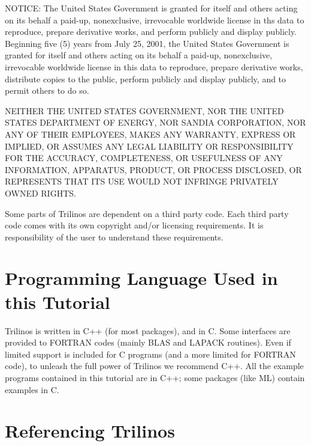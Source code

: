 NOTICE: The United States Government is granted for itself and others
acting on its behalf a paid-up, nonexclusive, irrevocable worldwide
license in ths data to reproduce, prepare derivative works, and perform
publicly and display publicly.  Beginning five (5) years from July 25,
2001, the United States Government is granted for itself and others
acting on its behalf a paid-up, nonexclusive, irrevocable worldwide
license in this data to reproduce, prepare derivative works, distribute
copies to the public, perform publicly and display publicly, and to
permit others to do so.

NEITHER THE UNITED STATES GOVERNMENT, NOR THE UNITED STATES DEPARTMENT
OF ENERGY, NOR SANDIA CORPORATION, NOR ANY OF THEIR EMPLOYEES, MAKES ANY
WARRANTY, EXPRESS OR IMPLIED, OR ASSUMES ANY LEGAL LIABILITY OR
RESPONSIBILITY FOR THE ACCURACY, COMPLETENESS, OR USEFULNESS OF ANY
INFORMATION, APPARATUS, PRODUCT, OR PROCESS DISCLOSED, OR REPRESENTS
THAT ITS USE WOULD NOT INFRINGE PRIVATELY OWNED RIGHTS.

\medskip

Some parts of Trilinos are dependent on a third party code. Each third
party code comes with its own copyright and/or licensing requirements.
It is responsibility of the user to understand these requirements.


\section{Programming Language Used in this Tutorial}
\label{sec:language}

Trilinos is written in C++ (for most packages), and in C. Some
interfaces are provided to FORTRAN codes (mainly BLAS and LAPACK
routines). Even if limited support is included for C programs (and a
more limited for FORTRAN code), to unleash the full power of Trilinos we
recommend C++. All the example programs contained in this tutorial are
in C++; some packages (like ML) contain examples in C.


\section{Referencing Trilinos}
\label{sec:referencing}

